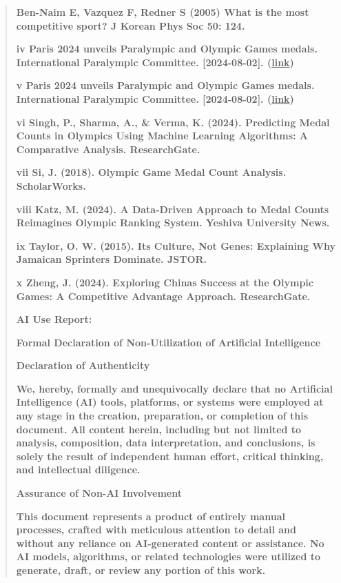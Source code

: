 \documentclass[12pt,a4paper]{article}
\renewenvironment{quote}{\begin{quotation}}{\end{quotation}}  %
\begin{document}
    \begin{quote}
    \textbf{Ben-Naim E, Vazquez F, Redner S (2005) What is the most
    competitive sport? J Korean Phys Soc 50: 124.}
    
    \textbf{iv Paris 2024 unveils Paralympic and Olympic Games medals.
    International Paralympic Committee. {[}2024-08-02{]}. (\ul{link})}
    
    \textbf{v Paris 2024 unveils Paralympic and Olympic Games medals.
    International Paralympic Committee. {[}2024-08-02{]}. (\ul{link})}
    
    \textbf{vi Singh, P., Sharma, A., \& Verma, K. (2024). Predicting Medal
    Counts in Olympics Using Machine Learning Algorithms: A Comparative
    Analysis. ResearchGate.}
    
    \textbf{vii Si, J. (2018). Olympic Game Medal Count Analysis.
    ScholarWorks.}
    
    \textbf{viii Katz, M. (2024). A Data-Driven Approach to Medal Counts
    Reimagines Olympic Ranking System. Yeshiva University News.}
    
    \textbf{ix Taylor, O. W. (2015). It\textquotesingle s Culture, Not
    Genes: Explaining Why Jamaican Sprinters Dominate. JSTOR.}
    
    \textbf{x Zheng, J. (2024). Exploring China\textquotesingle s Success at
    the Olympic Games: A Competitive Advantage Approach. ResearchGate.}
    
    \textbf{AI Use Report:}
    
    \textbf{Formal Declaration of Non-Utilization of Artificial
    Intelligence}
    
    \textbf{Declaration of Authenticity}
    
    \textbf{We, hereby, formally and unequivocally declare that no
    Artificial Intelligence (AI) tools, platforms, or systems were employed
    at any stage in the creation, preparation, or completion of this
    document. All content herein, including but not limited to analysis,
    composition, data interpretation, and conclusions, is solely the result
    of independent human effort, critical thinking, and intellectual
    diligence.}
    
    \textbf{Assurance of Non-AI Involvement}
    
    \textbf{This document represents a product of entirely manual processes,
    crafted with meticulous attention to detail and without any reliance on
    AI-generated content or assistance. No AI models, algorithms, or related
    technologies were utilized to generate, draft, or review any portion of
    this work.}
    

\end{quote}
\end{document}
